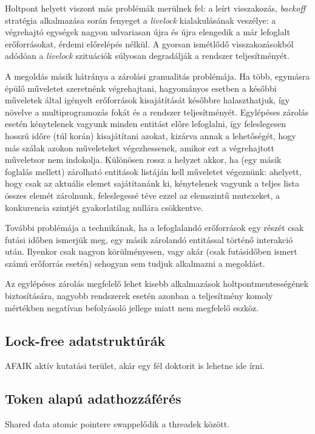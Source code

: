     Holtpont helyett viszont más problémák merülnek fel: a leírt visszakozás, \emph{backoff} stratégia alkalmazása során fenyeget a \emph{livelock} kialakulásának veszélye: a végrehajtó egységek nagyon udvariasan újra és újra elengedik a már lefoglalt erőforrásokat, érdemi előrelépés nélkül. A gyorsan ismétlődő visszakozásokból adódóan a \emph{livelock} szituációk súlyosan degradálják a rendszer teljesítményét.
    
    A megoldás másik hátránya a zárolási granualitás problémája. Ha több, egymásra épülő műveletet szeretnénk végrehajtani, hagyományos esetben a későbbi műveletek által igényelt erőforrások kisajátítását későbbre halaszthatjuk, így növelve a multiprogramozás fokát és a rendszer teljesítményét. Egylépéses zárolás esetén kénytelenek vagyunk minden entitást előre lefoglalni, így feleslegesen hosszú időre (túl korán) kisajátítani azokat, kizárva annak a lehetőségét, hogy más szálak azokon műveleteket végezhessenek, amikor ezt a végrehajtott műveletsor nem indokolja. Különösen rossz a helyzet akkor, ha (egy másik foglalás mellett) zárolható entitások listáján kell műveletet végeznünk: ahelyett, hogy csak az aktuális elemet sajátítanánk ki, kénytelenek vagyunk a teljes lista összes elemét zárolnunk, feleslegessé téve ezzel az elemszintű mutexeket, a konkurencia szintjét gyakorlatilag nullára csökkentve.
    
    További problémája a technikának, ha a lefoglalandó erőforrások egy részét csak futási időben ismerjük meg, egy másik zárolandó entitással történő interakció után. Ilyenkor csak nagyon körülményesen, vagy akár (csak futásidőben ismert számú erőforrás esetén) sehogyan sem tudjuk alkalmazni a megoldást.
    
    Az egylépéses zárolás megfelelő lehet kisebb alkalmazások holtpontmentességének biztosítására, nagyobb rendszerek esetén azonban a teljesítmény komoly mértékben negatívan befolyásoló jellege miatt nem megfelelő eszköz.
    
    \subsection{Lock-free adatstruktúrák} AFAIK aktív kutatási terület, akár egy fél doktorit is lehetne ide írni.
    \subsection{Token alapú adathozzáférés} Shared data atomic pointere swappelődik a threadek között.

